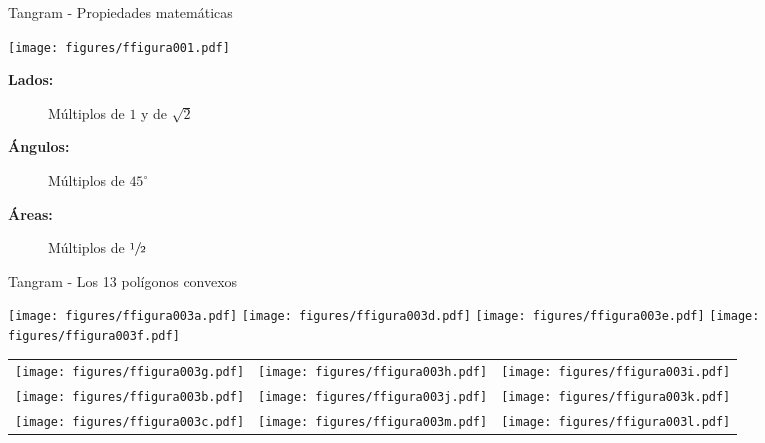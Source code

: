 \documentclass[14pt,aspectratio=169,usenames,dvipsnames]{beamer}
\begin{document}
    \begin{frame}{Tangram - Propiedades matemáticas}
        \begin{center}
            \texttt{[image: figures/ffigura001.pdf]} \\

            \bigskip

            \begin{minipage}{0.6\textwidth}
                \begin{description}
                    \item[\textbf{Lados:}]   Múltiplos de $1$ y de $\sqrt{2}$
                    \item[\textbf{Ángulos:}] Múltiplos de $45^\circ$
                    \item[\textbf{Áreas:}]   Múltiplos de $\sfrac{1}{2}$
                \end{description}
            \end{minipage}
        \end{center}
    \end{frame}


    \begin{frame}{Tangram - Los 13 polígonos convexos}
        \begin{center}
            \texttt{[image: figures/ffigura003a.pdf]}\qquad
            \texttt{[image: figures/ffigura003d.pdf]}\qquad
            \texttt{[image: figures/ffigura003e.pdf]}\qquad
            \texttt{[image: figures/ffigura003f.pdf]}\\ \bigskip
            \begin{tabular}{ccc}
                \texttt{[image: figures/ffigura003g.pdf]} &
                \texttt{[image: figures/ffigura003h.pdf]} &
                \texttt{[image: figures/ffigura003i.pdf]} \\[1ex]
                \texttt{[image: figures/ffigura003b.pdf]} &
                \texttt{[image: figures/ffigura003j.pdf]} &
                \texttt{[image: figures/ffigura003k.pdf]} \\[1ex]
                \texttt{[image: figures/ffigura003c.pdf]} &
                \texttt{[image: figures/ffigura003m.pdf]} &
                \texttt{[image: figures/ffigura003l.pdf]} \\[1ex]
            \end{tabular}\\
        \end{center}
    \end{frame}
\end{document}
